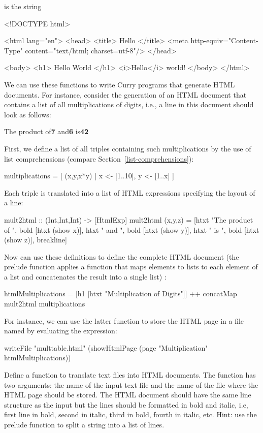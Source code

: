%
is the string
%
\begin{prog}
<!DOCTYPE html>

<html lang="en">
  <head>
    <title>
      Hello
    </title>
    <meta http-equiv="Content-Type" content="text/html; charset=utf-8"/>
  </head>
  
  <body>
    <h1>
      Hello World
    </h1>
    <i>Hello</i>
    world!
  </body>
</html>
\end{prog}
%
We can use these functions to write Curry programs that generate
HTML documents. For instance, consider the generation of an HTML
document that contains a list of all multiplications of digits,
i.e., a line in this document should look as follows:
\begin{prog}
{\rm The product of{\bf 7} and{\bf 6} is{\bf 42}}
\end{prog}
First, we define a list of all triples containing such multiplications
by the use of list comprehensions (compare Section~\ref{list-comprehensions}):
\begin{prog}
multiplications = [ (x,y,x*y) | x <- [1..10], y <- [1..x] ]
\end{prog}
Each triple is translated into a list of HTML expressions specifying the
layout of a line:
%
\begin{prog}
mult2html :: (Int,Int,Int) -> [HtmlExp]
mult2html (x,y,z) =
 [htxt "The product of ", bold [htxt (show x)],
  htxt " and ", bold [htxt (show y)],
  htxt " is ", bold [htxt (show z)], breakline]
\end{prog}
%
Now can use these definitions to define the complete
HTML document
(the prelude function 
applies a function that maps elements to lists to each element of a list
and concatenates the result into a single list)
:
\begin{prog}
htmlMultiplications =
 [h1 [htxt "Multiplication of Digits"]] ++ concatMap mult2html multiplications
\end{prog}
For instance, we can use the latter function to store the HTML page
in a file named  by evaluating the expression:
\begin{prog}
writeFile "multtable.html"
          (showHtmlPage (page "Multiplication" htmlMultiplications))
\end{prog}
%
\begin{exercise}
Define a function  to translate text files
into HTML documents.
The function has two arguments: the name of the input text file
and the name of the file where the HTML page should
be stored. The HTML document should have the same line structure
as the input but the lines should be formatted in bold and italic, i.e,
first line in bold, second in italic, third in bold, fourth in italic, etc.
Hint: use the prelude function 
to split a string into a list of lines.
\end{exercise}


